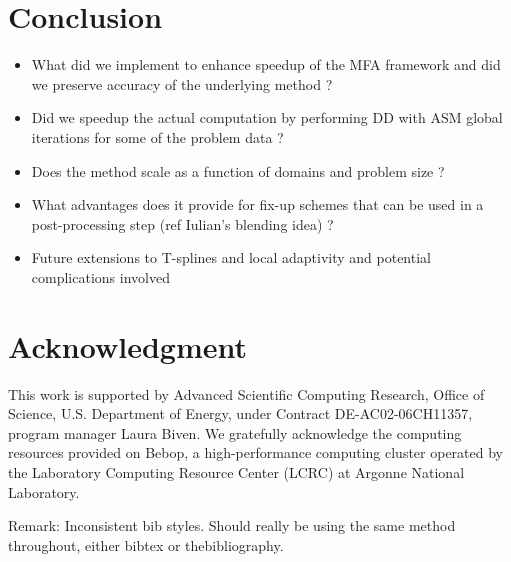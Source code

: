 \documentclass[conference]{IEEEtran}
\newcommand{\Remark}[1]{{\color{RED}\sf Remark: {#1}}}
\begin{document}

\section{Conclusion}

\begin{itemize}
	\item What did we implement to enhance speedup of the MFA framework and did we preserve accuracy of the underlying method ?
	\item Did we speedup the actual computation by performing DD with ASM global iterations for some of the problem data ?
	\item Does the method scale as a function of domains and problem size ? 
	\item What advantages does it provide for fix-up schemes that can be used in a post-processing step (ref Iulian's blending idea) ?
	\item Future extensions to T-splines and local adaptivity and potential complications involved
\end{itemize}

\section*{Acknowledgment}

This work is supported by Advanced Scientific Computing Research, Office of Science, U.S. Department of Energy, under
Contract DE-AC02-06CH11357, program manager Laura Biven. We gratefully acknowledge the computing resources provided on
Bebop, a high-performance computing cluster operated by the Laboratory Computing Resource Center (LCRC) at Argonne
National Laboratory.

\Remark{Inconsistent bib styles. Should really be using the same method throughout, either bibtex or thebibliography.}
\end{document}
